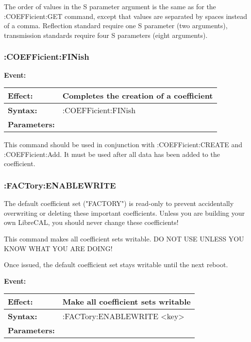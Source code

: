 \documentclass[a4paper,11pt]{article}
\newcommand{\dev}{LibreCAL}
\newcommand{\event}[3]{
\noindent\textbf{Event:}
\begin{longtable}{p{.15\textwidth} | p{.80\textwidth} } 
\hline
\textbf{Effect:} & #1 \\ \hline
\textbf{Syntax:} & #2 \\ \hline 
\textbf{Parameters:} & \makecell[Xl]{#3} \\ \hline
\end{longtable}
}
\begin{document}
The order of values in the S parameter argument is the same as for the :COEFFicient:GET command, except that values are separated by spaces instead of a comma. Reflection standard require one S parameter (two arguments), transmission standards require four S parameters (eight arguments).
\subsubsection{:COEFFicient:FINish}
\event{Completes the creation of a coefficient}{:COEFFicient:FINish}{None}
This command should be used in conjunction with :COEFFicient:CREATE and :COEFFicient:Add. It must be used after all data has been added to the coefficient.

\subsubsection{:FACTory:ENABLEWRITE}
The default coefficient set ("FACTORY") is read-only to prevent accidentally overwriting or deleting these important coefficients. Unless you are building your own \dev{}, you should never change these coefficients!

This command makes all coefficient sets writable. DO NOT USE UNLESS YOU KNOW WHAT YOU ARE DOING!

Once issued, the default coefficient set stays writable until the next reboot.

\event{Make all coefficient sets writable}{:FACTory:ENABLEWRITE <key>}{<key> Prevents accidental usage, set to "I\_AM\_SURE"}
\end{document}

